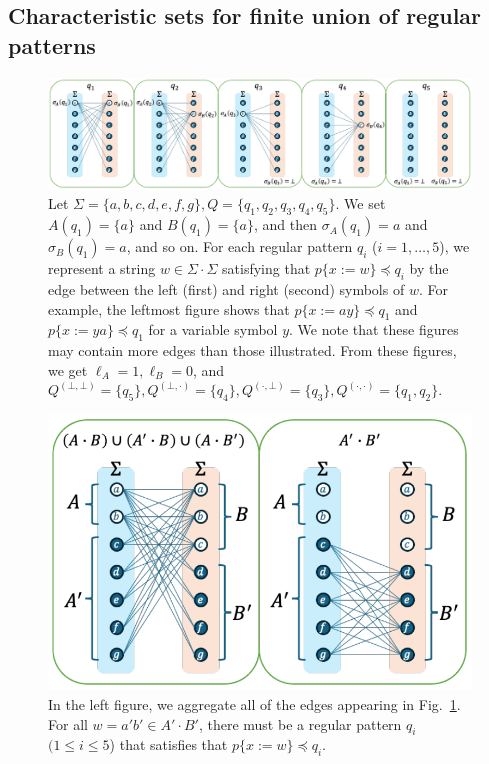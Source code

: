 \subsection{Characteristic sets for finite union of regular patterns}\label{subsec:char_union}

\begin{figure}[t]
  \begin{center}
    \includegraphics[scale=0.54]{figs/lem8eachreg.pdf}
    \caption{Let $\Sigma=\{a,b,c,d,e,f,g\}, Q=\{q_1,q_2,q_3,q_4,q_5\}$. We set $A(q_1)=\{a\}$ and $B(q_1)=\{a\}$, and then $\sigma_A(q_1)=a$ and $\sigma_B(q_1)=a$, and so on. For each regular pattern $q_i$ ($i=1,\ldots,5$), we represent a string $w \in \Sigma\cdot\Sigma$ satisfying that $p\{x:=w\}\preceq q_i$ by the edge between the left (first) and right (second) symbols of $w$. For example, the leftmost figure shows that $p\{x:=ay\}\preceq q_1$ and $p\{x:=ya\}\preceq q_1$ for a variable symbol $y$. We note that these figures may contain more edges than those illustrated. From these figures, we get $\ell_A=1, \ell_B=0$, and $Q^{(\bot,\bot)}=\{q_5\}, Q^{(\bot,\cdot)}=\{q_4\}, Q^{(\cdot,\bot)}=\{q_3\}, Q^{(\cdot,\cdot)}=\{q_1,q_2\}$.}\label{fig:lem8eachreg}
  \end{center}
\end{figure}

\begin{figure}[t]
  \begin{center}
    \includegraphics[scale=0.525]{figs/lem8totalreg.pdf}
    \caption{In the left figure, we aggregate all of the edges appearing in Fig.~\ref{fig:lem8eachreg}. For all $w=a'b'\in A'\cdot B'$, there must be a regular pattern $q_i$ $(1\leq i\leq 5$) that satisfies that $p \{ x:=w \} \preceq q_i$.}\label{fig:lem8totalreg}
  \end{center}
\end{figure}



